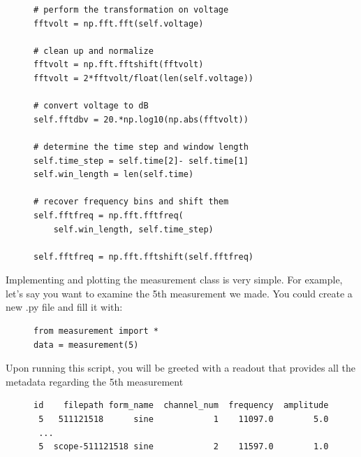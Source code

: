 \documentclass{article}
\begin{document}
\begin{figure}[H]
\centering
\begin{minipage}{1\textwidth}
\begin{tcolorbox}
\begin{verbatim}
# perform the transformation on voltage
fftvolt = np.fft.fft(self.voltage)

# clean up and normalize
fftvolt = np.fft.fftshift(fftvolt)
fftvolt = 2*fftvolt/float(len(self.voltage))

# convert voltage to dB
self.fftdbv = 20.*np.log10(np.abs(fftvolt))

# determine the time step and window length
self.time_step = self.time[2]- self.time[1]
self.win_length = len(self.time)

# recover frequency bins and shift them
self.fftfreq = np.fft.fftfreq(
    self.win_length, self.time_step)

self.fftfreq = np.fft.fftshift(self.fftfreq)
\end{verbatim}
\end{tcolorbox}
\end{minipage}
\end{figure}

Implementing and plotting the measurement class is very simple. For example,
let's say you want to examine the 5th measurement we made. You could create a
new .py file and fill it with:
\begin{figure}[H]
\centering
\begin{minipage}{1\textwidth}
\begin{tcolorbox}
\begin{verbatim}
from measurement import *
data = measurement(5)
\end{verbatim}
\end{tcolorbox}
\end{minipage}
\end{figure}

Upon running this script, you will be greeted with a readout that provides all
the metadata regarding the 5th measurement
\begin{figure}[H]
\centering
\begin{minipage}{1\textwidth}
\begin{tcolorbox}
\begin{verbatim}
id    filepath form_name  channel_num  frequency  amplitude
 5   511121518      sine            1    11097.0        5.0
 ...
 5  scope-511121518 sine            2    11597.0        1.0
\end{verbatim}
\end{tcolorbox}
\end{minipage}
\end{figure}
\end{document}
